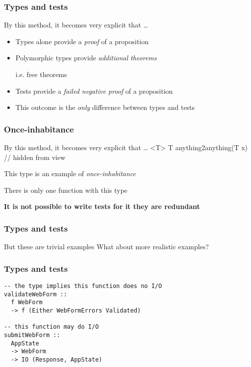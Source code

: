 \begin{frame}[fragile]
\frametitle{Types and tests}
\begin{block}{By this method, it becomes very explicit that \ldots}
\begin{itemize}
\item Types alone provide a \emph{proof} of a proposition
\item Polymorphic types provide \emph{additional theorems}
      
      i.e. free theorems
\item Tests provide a \emph{failed negative proof} of a proposition
\item This outcome is the \emph{only} difference between types and tests
\end{itemize}
\end{block}
\end{frame}

\begin{frame}[fragile]
\frametitle{Once-inhabitance}
\begin{block}{By this method, it becomes very explicit that \ldots}
<T> T anything2anything(T x) {
  // hidden from view 
}
\end{block}
\begin{center}
This type is an example of \emph{once-inhabitance}

There is only one function with this type

\textbf{It is not possible to write tests for it \textemdash they are redundant}
\end{center}
\end{frame}



\begin{frame}[fragile]
\frametitle{Types and tests}
\begin{block}{But these are trivial examples}
What about more realistic examples?
\end{block}
\end{frame}

\begin{frame}[fragile]
\frametitle{Types and tests}
\begin{block}{}
\begin{lstlisting}[style=haskell]
-- the type implies this function does no I/O
validateWebForm ::
  f WebForm
  -> f (Either WebFormErrors Validated)

-- this function may do I/O
submitWebForm ::
  AppState
  -> WebForm
  -> IO (Response, AppState)
\end{lstlisting}
\end{block}
\end{frame}

